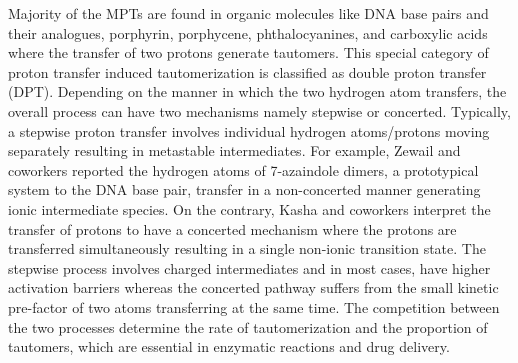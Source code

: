Majority of the MPTs are found in organic molecules like DNA base pairs\cite{watson1953molecular} and their analogues\cite{douhal1995femtosecond,ogawa2000phototautomerizable,abou2001tautomerization}, porphyrin\cite{storm1972nitrogen}, porphycene\cite{waluk2017spectroscopy}, phthalocyanines\cite{liljeroth2007current}, and carboxylic acids\cite{loerting1998toward} where the transfer of two protons generate tautomers. This special category of proton transfer induced tautomerization\cite{antonov2013tautomerism} is classified as double proton transfer (DPT). Depending on the manner in which the two hydrogen atom transfers, the overall process can have two mechanisms namely stepwise or concerted. Typically, a stepwise proton transfer involves individual hydrogen atoms/protons moving separately resulting in metastable intermediates. For example, Zewail and coworkers reported the hydrogen atoms of 7-azaindole dimers\cite{douhal1995femtosecond}, a prototypical system to the DNA base pair, transfer in a non-concerted manner generating ionic intermediate species. On the contrary, Kasha and coworkers\cite{catalan1999resolution} interpret the transfer of protons to have a concerted mechanism where the protons are transferred simultaneously resulting in a single non-ionic transition  state. The stepwise process involves charged intermediates and in most cases, have higher activation barriers whereas the concerted pathway suffers from the small kinetic pre-factor of two atoms transferring at the same time. The competition between the two processes determine the rate of tautomerization and the proportion of tautomers, which are essential in enzymatic reactions\cite{zhu2016tautomerization} and drug delivery\cite{wojnarowska2016tautomerism}.

